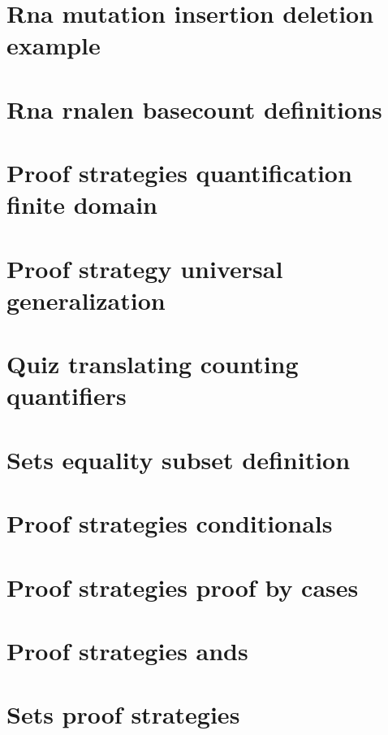 \section*{Rna mutation insertion deletion example}

\vfill
\section*{Rna rnalen basecount definitions}

\vfill
\section*{Proof strategies quantification finite domain}

\vfill
\section*{Proof strategy universal generalization}

\vfill
\section*{Quiz translating counting quantifiers}

\vfill
\section*{Sets equality subset definition}

\vfill
\section*{Proof strategies conditionals}

\vfill
\section*{Proof strategies proof by cases}

\vfill
\section*{Proof strategies ands}

\vfill
\section*{Sets proof strategies}

\vfill
